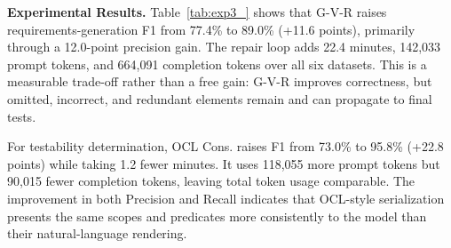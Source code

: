 \begin{table}[!t]
    \setlength{\tabcolsep}{15pt}
    \caption{Step-level evaluation against the expert-constructed gold standard frozen before any model variant is run. The same gold set is used for every variant. Fidelity and classification metrics are macro-averaged across the six financial datasets; time and tokens are totals for processing all six.}
    \label{tab:exp3_}
    \centering
    \vspace{-2mm}
\end{table}


\noindent
\textbf{Experimental Results.}
Table~\ref{tab:exp3_} shows that G-V-R raises requirements-generation F1 from
77.4\% to 89.0\% (+11.6 points), primarily through a 12.0-point precision
gain. The repair loop adds 22.4 minutes, 142,033 prompt tokens, and 664,091
completion tokens over all six datasets. This is a measurable trade-off rather
than a free gain: G-V-R improves correctness, but omitted, incorrect, and
redundant elements remain and can propagate to final tests.

For testability determination, OCL Cons. raises F1 from 73.0\% to 95.8\%
(+22.8 points) while taking 1.2 fewer minutes. It uses 118,055 more prompt tokens
but 90,015 fewer completion tokens, leaving total token usage comparable. The
improvement in both Precision and Recall indicates that OCL-style serialization
presents the same scopes and predicates more consistently to the model than
their natural-language rendering.

